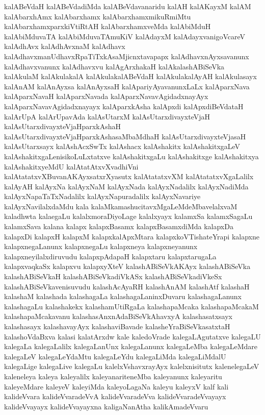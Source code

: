 {kalABeVdaH
kalABeVdadiMda
kalABeVdavanaridu
kalAH
kalAKayxM
kalAM
kalAbarxhAmx
kalAbarxhamx
kalAbarxhamxmikuRmiMtu
kalAbarxhamxparxkiVtiRtAH
kalAbarxhamxveMda
kalAbiMduH
kalAbiMduvaTA
kalAbiMduvaTAmuKiV
kalAdayxM
kalAdayxvanigoVcareV
kalAdhAvx
kalAdhAvxnaM
kalAdhavx
kalAdhavxmanUdhavxRpaTiTxkAsaMjicnxtavapapx
kalAdhavxnAyxsavanunx
kalAdhavxvanunx
kalAdhavxvu
kalAgArxhakaH
kalAkalashABiSeVka
kalAkulaM
kalAkulakalA
kalAkulakalABeVdaH
kalAkulakalAyAH
kalAkulasayx
kalAnAM
kalAnAyxsa
kalAnAyxsaH
kalApariyAyavanunxLaLx
kalAparxNava
kalAparxNavaH
kalAparxNavada
kalAparxNavavAgidadxnayAyx
kalAparxNavavAgidadxnayayx
kalAparxkAsha
kalApxdi
kalApxdiBeVdataH
kalArUpA
kalArUpavAda
kalAsUtarxM
kalAsUtarxdivayxteVjaH
kalAsUtarxdivayxteVjaHparxkAshaH
kalAsUtarxdivayxteVjaHparxkAshasaMbaMdhaH
kalAsUtarxdivayxteVjasaH
kalAsUtarxsayx
kalAshAcxSwTx
kalAshacx
kalAshakitx
kalAshakitxgaLeV
kalAshakitxgaLenisikoLuLxtatxve
kalAshakitxgaLu
kalAshakitxge
kalAshakitxya
kalAshakitxyeMdU
kalAtatAtxvXvadhiVni
kalAtatatxvXBuvanAKAyxsatxrXyasutx
kalAtatatxvXM
kalAtatatxvXgaLalilx
kalAyAH
kalAyxNa
kalAyxNaM
kalAyxNada
kalAyxNadalilx
kalAyxNadiMda
kalAyxNapaTaTxNadalilx
kalAyxNapuradalilx
kalAyxNavariye
kalAyxNavilalxdaMdu
kala
kalaMkamashucitavxMgaLeMdeMbavelalxvaM
kaladhwta
kalaegaLu
kalalxmoraDiyoLage
kalalxyayx
kalamxSa
kalamxSagaLu
kalamxSava
kalana
kalapx
kalapxBasamx
kalapxBasamxdiMda
kalapxDa
kalapxDi
kalapxH
kalapxM
kalapxkalApxMtara
kalapxkoVTishateYrapi
kalapxne
kalapxnegaLanunx
kalapxnegaLu
kalapxneya
kalapxneyanunx
kalapxneyilalxdiruvudu
kalapxpAdapaH
kalapxtaru
kalapxtarugaLa
kalapxvaqkaSx
kalapxvu
kalapxyXteV
kalashABiSeVkAKAyx
kalashABiSeVka
kalashABiSeVkaH
kalashABiSeVkadiVkASx
kalashABiSeVkadiVkeSx
kalashABiSeVkavenisuvudu
kalashAcAyaRH
kalashAnAM
kalashAtf
kalashaH
kalashaM
kalashada
kalashagaLa
kalashagaLaninxDuvaru
kalashagaLanunx
kalashagaLu
kalashakekx
kalashamUtiRgaLa
kalashapaMcaka
kalashapaMcakaM
kalashapaMcakavanu
kalashasAnxnAdaBiSeVkAhavxyA
kalashasatxsayx
kalashasayx
kalashavayAyx
kalashaviBavade
kalasheYraBiSeVkasatxtaH
kalashoVdaBxva
kalasi
kalatArxdw
kale
kaledoVrade
kalegaLAgutatxve
kalegaLU
kalegaLa
kalegaLalilx
kalegaLanUnx
kalegaLanunx
kalegaLeMba
kalegaLeMdare
kalegaLeV
kalegaLeYdaMtu
kalegaLeYdu
kalegaLiMda
kalegaLiMdalU
kalegaLige
kalegaLive
kalegaLu
kalelxVshavxrayAyx
kalelxnisitutx
kalenelegaLeV
kaleneleya
kaleya
kaleyalilx
kaleyanariteneMba
kaleyanunx
kaleyaritu
kaleyeMdare
kaleyeV
kaleyiMda
kaleyoLagaNa
kaleyu
kaleyxV
kalf
kali
kalideVvara
kalideVvaradeVvA
kalideVvaradeVva
kalideVvaradeVvayayx
kalideVvayayx
kalideVvayayxna
kaligaNanAtha
kalikAmadeVvaru
}
